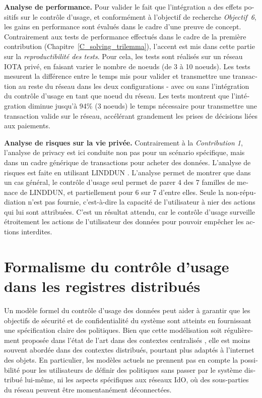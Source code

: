 \begin{otherlanguage}{french}
\textbf{Analyse de performance.} Pour valider le fait que l'intégration a des effets positifs sur le contrôle d'usage, et conformément à l'objectif de recherche \emph{Objectif~6}, les gains en performance sont évalués dans le cadre d'une preuve de concept. Contrairement aux tests de performance effectués dans le cadre de la première contribution (Chapitre~\ref{C_solving_trilemma}), l'accent est mis dans cette partie sur la \emph{reproductibilité des tests}. Pour cela, les tests sont réalisés sur un réseau IOTA privé, en faisant varier le nombre de noeuds (de 3 à 10 noeuds). Les tests mesurent la différence entre le temps mis pour valider et transmettre une transaction au reste du réseau dans les deux configurations - avec ou sans l'intégration du contrôle d'usage en tant que noeud du réseau. Les tests montrent que l'intégration diminue jusqu'à 94\% (3 noeuds) le temps nécessaire pour transmettre une transaction valide sur le réseau, accélérant grandement les prises de décisions liées aux paiements. 

\textbf{Analyse de risques sur la vie privée.} Contrairement à la \emph{Contribution 1}, l'analyse de privacy est ici conduite non pas pour un scénario spécifique, mais dans un cadre générique de transactions pour acheter des données. L'analyse de risques est faite en utilisant LINDDUN \cite{Wuyts2015}. L'analyse permet de montrer que dans un cas général, le contrôle d'usage seul permet de parer 4 des 7 familles de menace de LINDDUN, et partiellement pour 6 sur 7 d'entre elles. Seule la non-répudiation n'est pas fournie, c'est-à-dire la capacité de l'utilisateur à nier des actions qui lui sont attribuées. C'est un résultat attendu, car le contrôle d'usage surveille étroitement les actions de l'utilisateur des données pour pouvoir empêcher les actions interdites. 

\section*{Formalisme du contrôle d'usage dans les registres distribués}

Un modèle formel du contrôle d'usage des données peut aider à garantir que les objectifs de sécurité et de confidentialité du système sont atteints en fournissant une spécification claire des politiques. Bien que cette modélisation soit régulièrement proposée dans l'état de l'art dans des contextes centralisés \cite{Pretschner2011, Kelbert2013,Fromm2020}, elle est moins souvent abordée dans des contextes distribués, pourtant plus adaptés à l'internet des objets. En particulier, les modèles actuels ne prennent pas en compte la possibilité pour les utilisateurs de définir des politiques sans passer par le système distribué lui-même, ni les aspects spécifiques aux réseaux IdO, où des sous-parties du réseau peuvent être momentanément déconnectées.


\end{otherlanguage}
